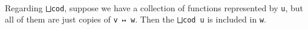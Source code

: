 \begin{fence}
\begin{code}
\AgdaSymbol{(}\AgdaSpace{}%
\AgdaSymbol{)}\<%
\\
\>[0]\AgdaSpace{}%
\AgdaSymbol{\{}\AgdaSpace{}%
\AgdaSpace{}%
\AgdaSymbol{\}}\AgdaSpace{}%
\AgdaSpace{}%
\AgdaSymbol{(}\AgdaSpace{}%
\AgdaSymbol{)}\AgdaSpace{}%
\AgdaSpace{}%
\AgdaSymbol{=}\<%
\\
\>[0][@{}l@{\AgdaIndent{0}}]%
\>[3]\AgdaSpace{}%
\AgdaSpace{}%
\AgdaSymbol{=}\AgdaSpace{}%
\AgdaSpace{}%
\AgdaSpace{}%
\AgdaSpace{}%
\AgdaSpace{}%
\AgdaSpace{}%
\AgdaSymbol{(}\AgdaSpace{}%
\AgdaSymbol{))}\AgdaSpace{}%
\AgdaSpace{}%
\<%
\\
%
\>[3]\AgdaSpace{}%
\AgdaSymbol{(}\AgdaSpace{}%
\AgdaSymbol{)}\<%
\end{code}
\end{fence}

Regarding \texttt{⨆cod}, suppose we have a collection of functions
represented by \texttt{u}, but all of them are just copies of
\texttt{v\ ↦\ w}. Then the \texttt{⨆cod\ u} is included in \texttt{w}.

